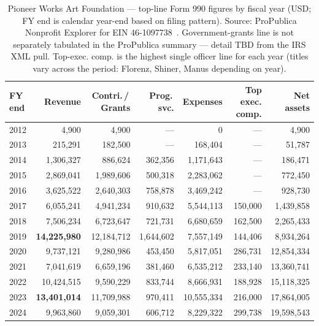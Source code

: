 \documentclass[10pt,letterpaper,twocolumn]{article}
\begin{document}
\begin{table}[t]
\footnotesize
\centering
\setlength{\tabcolsep}{4pt}
\begin{tabularx}{\textwidth}{Xrrrrrr}
\toprule
\textbf{FY end} & \textbf{Revenue} & \textbf{Contri.\,/\,Grants} & \textbf{Prog.\,svc.} & \textbf{Expenses} & \textbf{Top exec. comp.} & \textbf{Net assets} \\
\midrule
2012 & 4{,}900 & 4{,}900 & --- & 0 & --- & 4{,}900 \\
2013 & 215{,}291 & 182{,}500 & --- & 168{,}404 & --- & 51{,}787 \\
2014 & 1{,}306{,}327 & 886{,}624 & 362{,}356 & 1{,}171{,}643 & --- & 186{,}471 \\
2015 & 2{,}869{,}041 & 1{,}989{,}606 & 500{,}318 & 2{,}283{,}062 & --- & 772{,}450 \\
2016 & 3{,}625{,}522 & 2{,}640{,}303 & 758{,}878 & 3{,}469{,}242 & --- & 928{,}730 \\
2017 & 6{,}055{,}241 & 4{,}941{,}234 & 910{,}632 & 5{,}544{,}113 & 150{,}000 & 1{,}439{,}858 \\
2018 & 7{,}506{,}234 & 6{,}723{,}647 & 721{,}731 & 6{,}680{,}659 & 162{,}500 & 2{,}265{,}433 \\
2019 & \textbf{14{,}225{,}980} & 12{,}184{,}712 & 1{,}644{,}602 & 7{,}557{,}149 & 144{,}406 & 8{,}934{,}264 \\
2020 & 9{,}737{,}121 & 9{,}280{,}986 & 453{,}450 & 5{,}817{,}051 & 286{,}731 & 12{,}854{,}334 \\
2021 & 7{,}041{,}619 & 6{,}659{,}196 & 381{,}460 & 6{,}535{,}212 & 233{,}140 & 13{,}360{,}741 \\
2022 & 10{,}424{,}515 & 9{,}590{,}229 & 833{,}744 & 8{,}666{,}931 & 188{,}928 & 15{,}118{,}325 \\
2023 & \textbf{13{,}401{,}014} & 11{,}709{,}988 & 970{,}411 & 10{,}555{,}334 & 216{,}000 & 17{,}864{,}005 \\
2024 & 9{,}963{,}860 & 9{,}059{,}301 & 606{,}712 & 8{,}229{,}322 & 299{,}738 & 19{,}598{,}543 \\
\bottomrule
\end{tabularx}
\caption{Pioneer Works Art Foundation --- top-line Form 990 figures by fiscal year (USD; FY end is calendar year-end based on filing pattern). Source: ProPublica Nonprofit Explorer for EIN 46-1097738~\citep{propublica2026pioneer}. Government-grants line is not separately tabulated in the ProPublica summary --- detail TBD from the IRS XML pull. Top-exec. comp. is the highest single officer line for each year (titles vary across the period: Florenz, Shiner, Manus depending on year).}
\label{tab:financials}
\end{table}
\end{document}
